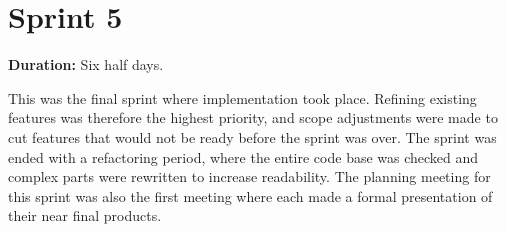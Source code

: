 \section{Sprint 5}%

\textbf{Duration:} Six half days. \newline

This was the final sprint where implementation took place. 
Refining existing features was therefore the highest priority, and scope adjustments were made to cut features that would not be ready before the sprint was over. 
The sprint was ended with a refactoring period, where the entire code base was checked and complex parts were rewritten to increase readability. \newline
The planning meeting for this sprint was also the first meeting where each \localgroup{} made a formal presentation of their near final products.